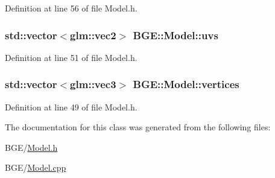Definition at line 56 of file Model.\-h.

\hypertarget{class_b_g_e_1_1_model_ab87b9ba4866781f4db316507f0391e00}{
\subsubsection[{uvs}]{\setlength{\rightskip}{0pt plus 5cm}std\-::vector$<$glm\-::vec2$>$ B\-G\-E\-::\-Model\-::uvs}}\label{class_b_g_e_1_1_model_ab87b9ba4866781f4db316507f0391e00}


Definition at line 51 of file Model.\-h.

\hypertarget{class_b_g_e_1_1_model_a4cea848aab716e40b9bde28cd922720d}{
\subsubsection[{vertices}]{\setlength{\rightskip}{0pt plus 5cm}std\-::vector$<$glm\-::vec3$>$ B\-G\-E\-::\-Model\-::vertices}}\label{class_b_g_e_1_1_model_a4cea848aab716e40b9bde28cd922720d}


Definition at line 49 of file Model.\-h.



The documentation for this class was generated from the following files\-:\begin{DoxyCompactItemize}
\item 
B\-G\-E/\hyperlink{_model_8h}{Model.\-h}\item 
B\-G\-E/\hyperlink{_model_8cpp}{Model.\-cpp}\end{DoxyCompactItemize}
